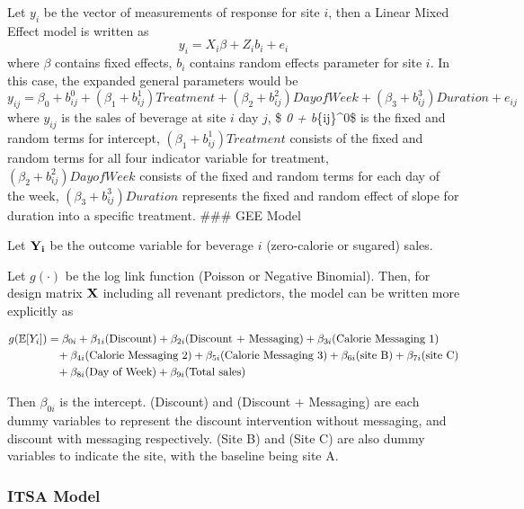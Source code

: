 \documentclass[
]{article}
\begin{document}
Let \(y_i\) be the vector of measurements of response for site \(i\),
then a Linear Mixed Effect model is written as
\[y_i = X_i\beta + Z_i b_i + e_i\] where \(\beta\) contains fixed
effects, \(b_i\) contains random effects parameter for site \(i\). In
this case, the expanded general parameters would be
\[y_{ij}  = \beta_0 + b_{ij}^0 + (\beta_1 + b_{ij}^1)Treatment + (\beta_2 + b_{ij}^2)Day of Week +(\beta_3 + b_{ij}^3)Duration +e_{ij}\]
where \(y_{ij}\) is the sales of beverage at site \(i\) day \(j\), \$
\beta\emph{0 + b}\{ij\}\^{}0\$ is the fixed and random terms for
intercept, \((\beta_1 + b_{ij}^1)Treatment\) consists of the fixed and
random terms for all four indicator variable for treatment,
\((\beta_2 + b_{ij}^2)Day of Week\) consists of the fixed and random
terms for each day of the week, \((\beta_3 + b_{ij}^3)Duration\)
represents the fixed and random effect of slope for duration into a
specific treatment. \#\#\# GEE Model

Let \({\bf Y_i}\) be the outcome variable for beverage \(i\)
(zero-calorie or sugared) sales.

Let \(g(\cdot)\) be the log link function (Poisson or Negative
Binomial). Then, for design matrix \({\bf X}\) including all revenant
predictors, the model can be written more explicitly as

\begin{align*}
g(\mathbb{E}[Y_i]) &= \beta_{0i} + \beta_{1i} (\text{Discount}) + \beta_{2i} (\text{Discount + Messaging}) + \beta_{3i} (\text{Calorie Messaging 1})  \\
&\hspace{3mm} + \beta_{4i} (\text{Calorie Messaging 2}) + \beta_{5i} (\text{Calorie Messaging 3}) + \beta_{6i} (\text{site B}) + \beta_{7i} (\text{site C})\\
&\hspace{3mm} + \beta_{8i} (\text{Day of Week})+ \beta_{9i} (\text{Total sales})
\end{align*}

Then \(\beta_{0i}\) is the intercept. (Discount) and (Discount +
Messaging) are each dummy variables to represent the discount
intervention without messaging, and discount with messaging
respectively. (Site B) and (Site C) are also dummy variables to indicate
the site, with the baseline being site A.

\hypertarget{itsa-model}{%
\subsubsection{ITSA Model}\label{itsa-model}}
\end{document}
